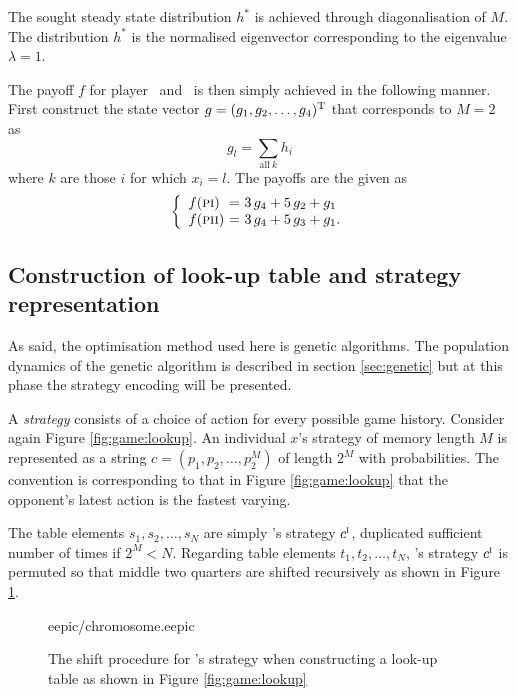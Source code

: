 The sought steady state distribution $h^\ast$ is achieved through diagonalisation of $M$. The distribution $h^\ast$ is the normalised eigenvector corresponding to the eigenvalue $\lambda = 1$.\mypar

The payoff $f$ for player \pone\ and \ptwo\ is then simply achieved in the following manner. First construct the state vector $g = (g_1, g_2, \dots, g_4)^{\mathrm{T}}$ that corresponds to $M = 2$ %
as
\begin{displaymath}
g_l = \sum_{\mathrm{all~} k } h_i
\end{displaymath}
where $k$ are those $i$ for which $x_i = l$. The payoffs are the given as
\begin{equation}
\left\{
\begin{array}{l@{~=~}l}
f(\pone) & 3\, g_4 + 5\, g_2 + g_1 \\[.5\baselineskip]
f(\ptwo) & 3\, g_4 + 5\, g_3 + g_1.
\end{array}
\right.
\label{equ:game:payoff}
\end{equation}

\subsection{Construction of look-up table and strategy representation} %
As said, the optimisation method used here is genetic algorithms. The population dynamics of the genetic algorithm is described in section \ref{sec:genetic} but at this phase the strategy encoding will be presented.\mypar

A \textit{strategy} consists of a choice of action for every possible game history. Consider again Figure \ref{fig:game:lookup}. An individual $x$'s strategy of memory length $M$ is represented as a string $c = (p_1, p_2, \dots, p_2^M)$ of length $2^M$ with probabilities. The convention is corresponding to that in Figure \ref{fig:game:lookup} that the opponent's latest action is the fastest varying.\mypar

The table elements $s_1, s_2, \dots, s_N$ are simply \pone's strategy $c^{\textsc{i}}$, duplicated sufficient number of times if $2^M < N$. Regarding table elements $t_1, t_2, \dots, t_N$, \ptwo's strategy $c^{\textsc{i}}$ is permuted so that middle two quarters are shifted recursively as shown in Figure \ref{fig:game:shift}.\mypar

\begin{figure}[!htbp]\centering \footnotesize
 {eepic/chromosome.eepic}
\caption{The shift procedure for \ptwo's strategy when constructing a look-up table as shown in Figure \ref{fig:game:lookup}}
\label{fig:game:shift}
\end{figure}


